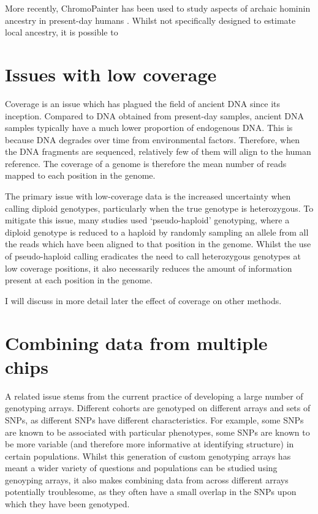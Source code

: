 More recently, ChromoPainter has been used to study aspects of archaic hominin ancestry in present-day humans \cite{JACOBS20191010, teixeira2021widespread}. Whilst not specifically designed to estimate local ancestry, it is possible to 


\section{Issues with low coverage}

Coverage is an issue which has plagued the field of ancient DNA since its inception. Compared to DNA obtained from present-day samples, ancient DNA samples typically have a much lower proportion of endogenous DNA. This is because DNA degrades over time from environmental factors. Therefore, when the DNA fragments are sequenced, relatively few of them will align to the human reference. The coverage of a genome is therefore the mean number of reads mapped to each position in the genome. 

The primary issue with low-coverage data is the increased uncertainty when calling diploid genotypes, particularly when the true genotype is heterozygous. To mitigate this issue, many studies used `pseudo-haploid' genotyping, where a diploid genotype is reduced to a haploid by randomly sampling an allele from all the reads which have been aligned to that position in the genome. Whilst the use of pseudo-haploid calling eradicates the need to call heterozygous genotypes at low coverage positions, it also necessarily reduces the amount of information present at each position in the genome.

I will discuss in more detail later the effect of coverage on other methods. 

\section{Combining data from multiple chips}

A related issue stems from the current practice of developing a large number of genotyping arrays. Different cohorts are genotyped on different arrays and sets of SNPs, as different SNPs have different characteristics. For example, some SNPs are known to be associated with particular phenotypes, some SNPs are known to be more variable (and therefore more informative at identifying structure) in certain populations. Whilst this generation of custom genotyping arrays has meant a wider variety of questions and populations can be studied using genoyping arrays, it also makes combining data from across different arrays potentially troublesome, as they often have a small overlap in the SNPs upon which they have been genotyped.

